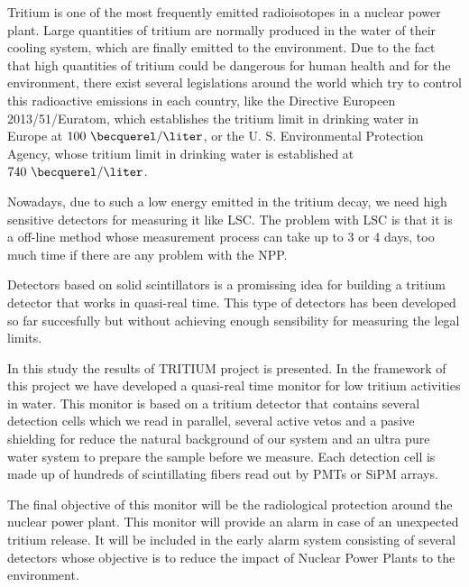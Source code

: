 Tritium is one of the most frequently emitted radioisotopes in a nuclear power plant. Large quantities of tritium are normally produced in the water of their cooling system, which are finally emitted to the environment. Due to the fact that high quantities of tritium could be dangerous for human health and for the environment, there exist several legislations around the world which try to control this radioactive emissions in each country, like the Directive Europeen 2013/51/Euratom, which establishes the tritium limit in drinking water in Europe at $100~\becquerel/\liter$, or the U. S. Environmental Protection Agency, whose tritium limit in drinking water is established at $740~\becquerel/\liter$.

Nowadays, due to such a low energy emitted in the tritium decay, we need high sensitive detectors for measuring it like LSC. The problem with LSC is that it is a off-line method whose measurement process can take up to 3 or 4 days, too much time if there are any problem with the NPP.

Detectors based on solid scintillators is a promissing idea for building a tritium detector that works in quasi-real time. This type of detectors has been developed so far succesfully but without achieving enough sensibility for measuring the legal limits.

In this study the results of TRITIUM project is presented. In the framework of this project we have developed a quasi-real time monitor for low tritium activities in water. This monitor is based on a tritium detector that contains several detection cells which we read in parallel, several active vetos and a pasive shielding for reduce the natural background of our system and an ultra pure water system to prepare the sample before we measure. Each detection cell is made up of hundreds of scintillating fibers read out by PMTs or SiPM arrays.

The final objective of this monitor will be the radiological protection around the nuclear power plant. This monitor will provide an alarm in case of an unexpected tritium release. It will be included in the early alarm system consisting of several detectors whose objective is to reduce the impact of Nuclear Power Plants to the environment.